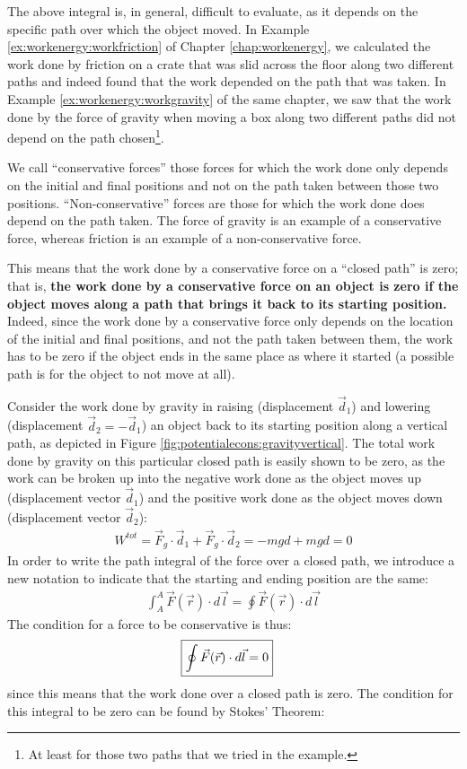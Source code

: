 The above integral is, in general, difficult to evaluate, as it depends on the specific path over which the object moved. In Example \ref{ex:workenergy:workfriction} of Chapter \ref{chap:workenergy}, we calculated the work done by friction on a crate that was slid across the floor along two different paths and indeed found that the work depended on the path that was taken. In Example \ref{ex:workenergy:workgravity} of the same chapter, we saw that the work done by the force of gravity when moving a box along two different paths did not depend on the path chosen\footnote{At least for those two paths that we tried in the example.}.

We call ``conservative forces'' those forces for which the work done only depends on the initial and final positions and not on the path taken between those two positions. ``Non-conservative'' forces are those for which the work done does depend on the path taken. The force of gravity is an example of a conservative force, whereas friction is an example of a non-conservative force.

This means that the work done by a conservative force on a ``closed path'' is zero; that is, \textbf{the work done by a conservative force on an object is zero if the object moves along a path that brings it back to its starting position.}
Indeed, since the work done by a conservative force only depends on the location of the initial and final positions, and not the path taken between them, the work has to be zero if the object ends in the same place as where it started (a possible path is for the object to not move at all).

Consider the work done by gravity in raising (displacement $\vec d_1$) and lowering (displacement $\vec d_2=-\vec d_1$) an object back to its starting position along a vertical path, as depicted in Figure \ref{fig:potentialecons:gravityvertical}.
The total work done by gravity on this particular closed path is easily shown to be zero, as the work can be broken up into the negative work done as the object moves up (displacement vector $\vec d_1$) and the positive work done as the object moves down (displacement vector $\vec d_2$):
\begin{align*}
W^{tot} = \vec F_g \cdot \vec d_1 + \vec F_g \cdot \vec d_2 = -mgd + mgd = 0 
\end{align*}
In order to write the path integral of the force over a closed path, we introduce a new notation to indicate that the starting and ending position are the same:
\begin{align*}
\int_A^A \vec F(\vec r) \cdot d\vec l = \oint \vec F(\vec r) \cdot d\vec l
\end{align*}
The condition for a force to be conservative is thus:
\begin{align}
\Aboxed{\oint \vec F(\vec r) \cdot d\vec l = 0}
\end{align}
since this means that the work done over a closed path is zero. The condition for this integral to be zero can be found by Stokes' Theorem:

